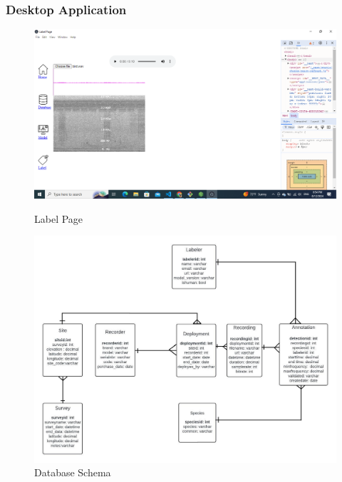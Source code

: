 \begin{frame}
    \frametitle{Desktop Application}

    \begin{figure}
        \centering
        \begin{minipage}{0.48\textwidth}
            \centering
            \includegraphics[width=\textwidth]{label.png}
            \caption{Label Page}
        \end{minipage}
        \hfill
        \begin{minipage}{0.48\textwidth}
            \centering
            \includegraphics[width=\textwidth]{database.jpg}
            \caption{Database Schema}
        \end{minipage}
    \end{figure}

\end{frame}

